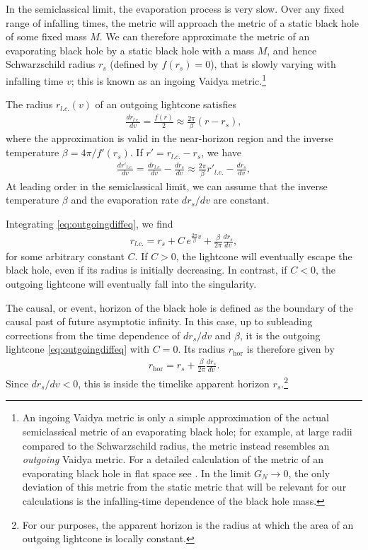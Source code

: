 \documentclass[12pt]{article}
\begin{document}
In the semiclassical limit, the evaporation process is very slow. Over any fixed range of infalling times, the metric will approach the metric of a static black hole of some fixed mass $M$. We can therefore approximate the metric of an evaporating black hole by a static black hole with a mass $M$, and hence Schwarzschild radius $r_s$ (defined by $f(r_s) = 0$), that is slowly varying with infalling time $v$; this is known as an ingoing Vaidya metric.\footnote{An ingoing Vaidya metric is only a simple approximation of the actual semiclassical metric of an evaporating black hole; for example, at large radii compared to the Schwarzschild radius, the metric instead resembles an \emph{outgoing} Vaidya metric. For a detailed calculation of the metric of an evaporating black hole in flat space see \cite{abdolrahimi2016ingoing}. In the limit $G_N \to 0$, the only deviation of this metric from the static metric that will be relevant for our calculations is the infalling-time dependence of the black hole mass.}

The radius $r_{l.c.}(v)$ of an outgoing lightcone satisfies
\begin{align} \label{eq:outgoinglc}
\frac{dr_{l.c.}}{dv} = \frac{f(r)}{2} \approx \frac{2\pi}{\beta} (r - r_s),
\end{align}
where the approximation is valid in the near-horizon region and the inverse temperature $\beta = 4 \pi / f'(r_s)$. If $r' = r_{l.c.} - r_s$, we have
\begin{align} \label{eq:outgoingdiffeq}
\frac{dr'_{l.c.}}{dv} = \frac{dr_{l.c.}}{dv} - \frac{d r_s}{d v} \approx \frac{2\pi}{\beta} r'_{l.c.} - \frac{d r_s}{d v},
\end{align}
At leading order in the semiclassical limit, we can assume that the inverse temperature $\beta$ and the evaporation rate $d r_s / d v$ are constant.

Integrating \eqref{eq:outgoingdiffeq}, we find
\begin{align} \label{eq:arbitraryoutgoinglc}
r_{l.c.} = r_s + C \,e^{\frac{2\pi}{\beta}v} + \frac{\beta}{2 \pi} \frac{d r_s}{d v},
\end{align}
for some arbitrary constant $C$. If $C>0$, the lightcone will eventually escape the black hole, even if its radius is initially decreasing. In contrast, if $C<0$, the outgoing lightcone will eventually fall into the singularity.

The causal, or event, horizon of the black hole is defined as the boundary of the causal past of future asymptotic infinity. In this case, up to subleading corrections from the time dependence of $dr_s/dv$ and $\beta$, it is the outgoing lightcone \eqref{eq:outgoingdiffeq} with $C=0$. Its radius $r_\text{hor}$ is therefore given by
\begin{align} \label{eq:rhor}
r_\text{hor} = r_s + \frac{\beta}{2 \pi} \frac{d r_s}{d v}.
\end{align}
Since $d r_s/d v < 0$, this is inside the timelike apparent horizon $r_s$.\footnote{For our purposes, the apparent horizon is the radius at which the area of an outgoing lightcone is locally constant.}
\end{document}
